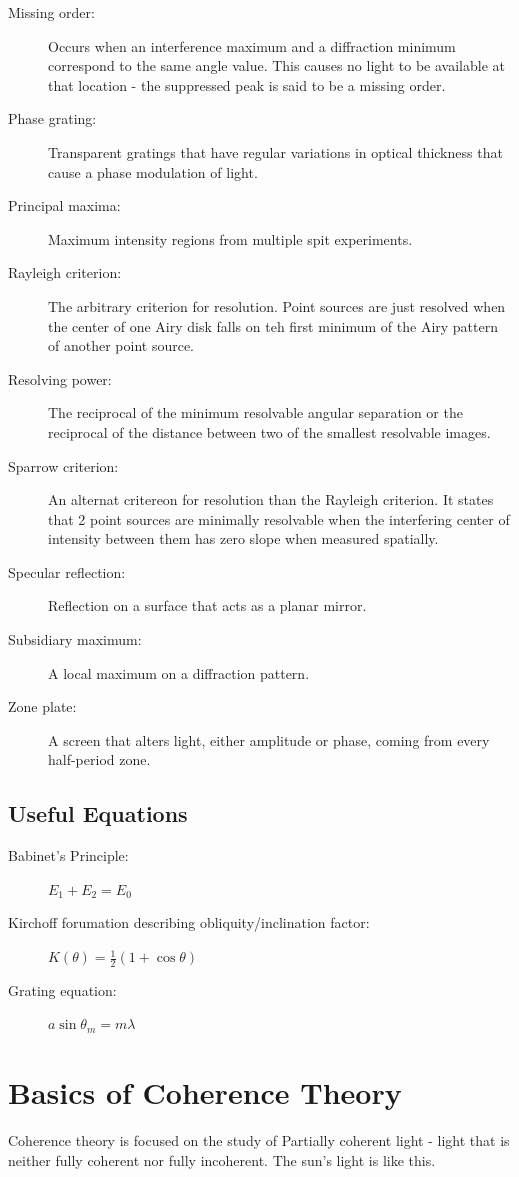 \documentclass[12pt]{report}
\begin{document}
\begin{description}
\item[Missing order: ] Occurs when an interference maximum and a diffraction minimum  correspond to the same angle value. This causes no light to be available at that location - the suppressed peak is said to be a missing order. 
\item[Phase grating: ] Transparent gratings that have regular variations in optical thickness that cause a phase modulation of light. 
\item[Principal maxima: ] Maximum intensity regions from multiple spit experiments. 
\item[Rayleigh criterion: ] The arbitrary criterion for resolution. Point sources are just resolved when the center of one Airy disk falls on teh first minimum of the Airy pattern of another point source. 
\item[Resolving power: ] The reciprocal of the minimum resolvable angular separation or the reciprocal of the distance between two of the smallest resolvable images. 
\item[Sparrow criterion: ] An alternat critereon for resolution than the Rayleigh criterion. It states that 2 point sources are minimally resolvable when the interfering center of intensity between them has zero slope when measured spatially. 
\item[Specular reflection: ] Reflection on a surface that acts as a planar mirror. 
\item[Subsidiary maximum: ] A local maximum on a diffraction pattern. 
\item[Zone plate: ] A screen that alters light, either amplitude or phase, coming from every half-period zone. 

\end{description}

\section{Useful Equations}
\begin{description}
\item[Babinet's Principle: ] $E_1 + E_2 = E _0$
\item[Kirchoff forumation describing obliquity/inclination factor:] $K(\theta) = \frac{1}{2} (1+\cos \theta )$
\item[Grating equation: ] $a \sin \theta_m = m\lambda$
\end{description}



\chapter{Basics of Coherence Theory}
Coherence theory is focused on the study of Partially coherent light - light that is neither fully coherent nor fully incoherent. The sun's light is like this. 
\end{document}
